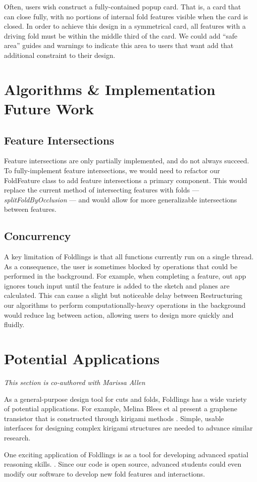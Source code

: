 Often, users wish construct a fully-contained popup card. That is, a
card that can close fully, with no portions of internal fold features
visible when the card is closed. In order to achieve this design in a
symmetrical card, all features with a driving fold must be within the
middle third of the card. We could add ``safe area'' guides and warnings
to indicate this area to users that want add that additional constraint
to their design.

\section{Algorithms \& Implementation Future
Work}\label{algorithms-implementation-future-work}

\subsection{Feature Intersections}\label{feature-intersections}

Feature intersections are only partially implemented, and do not always
succeed. To fully-implement feature intersections, we would need to
refactor our FoldFeature class to add feature intersections a primary
component. This would replace the current method of intersecting
features with folds --- \emph{splitFoldByOcclusion} --- and would allow
for more generalizable intersections between features.

\subsection{Concurrency}\label{concurrency}

A key limitation of Foldlings is that all functions currently run on a
single thread. As a consequence, the user is sometimes blocked by
operations that could be performed in the background. For example, when
completing a feature, out app ignores touch input until the feature is
added to the sketch and planes are calculated. This can cause a slight
but noticeable delay between Restructuring our algorithms to perform
computationally-heavy operations in the background would reduce lag
between action, allowing users to design more quickly and fluidly.

\section{Potential Applications}\label{potential-applications}

\emph{This section is co-authored with Marissa Allen}

As a general-purpose design tool for cuts and folds, Foldlings has a
wide variety of potential applications. For example, Melina Blees et al
present a graphene transistor that is constructed through kirigami
methods \citet{blees2014graphene}. Simple, usable interfaces for
designing complex kirigami structures are needed to advance similar
research.

One exciting application of Foldlings is as a tool for developing
advanced spatial reasoning skills. \citet{taylor2013think3d}. Since our
code is open source, advanced students could even modify our software to
develop new fold features and interactions.

